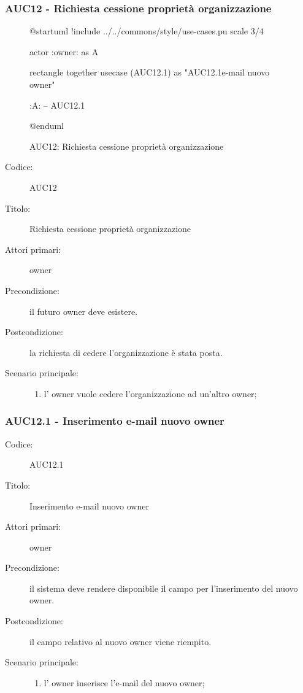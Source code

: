 \documentclass[casi-duso]{subfiles}
\begin{document}
\subsubsection{AUC12 - Richiesta cessione proprietà organizzazione}%
\label{subsub:AUC12}

\begin{figure}[h!] 
  \centering 
  \begin{plantuml}
  @startuml 
  !include ../../commons/style/use-cases.pu
  scale 3/4

  actor :owner: as A

  rectangle {
    together {
      usecase (AUC12.1) as "AUC12.1\nInserimento e-mail nuovo owner"
    }
  }

  :A: -- AUC12.1

  @enduml
  \end{plantuml} 
  \caption{AUC12: Richiesta cessione proprietà organizzazione} 
  \label{fig:auc12} 
\end{figure}

\begin{description}
  \item[Codice:] AUC12
  \item[Titolo:] Richiesta cessione proprietà organizzazione
  \item[Attori primari:] owner
  \item[Precondizione:] il futuro owner deve esistere.
  \item[Postcondizione:] la richiesta di cedere l'organizzazione è stata posta.
  \item[Scenario principale:] 
  \begin{enumerate}
    \item l' owner vuole cedere l'organizzazione ad un'altro owner;
  \end{enumerate}
\end{description}

\subsubsection{AUC12.1 - Inserimento e-mail nuovo owner}%
\label{subsub:AUC12.1}
\begin{description}
  \item[Codice:] AUC12.1
  \item[Titolo:] Inserimento e-mail nuovo owner
  \item[Attori primari:] owner
  \item[Precondizione:] il sistema deve rendere disponibile il campo per l'inserimento del nuovo owner.
  \item[Postcondizione:] il campo relativo al nuovo owner viene riempito.
  \item[Scenario principale:] 
  \begin{enumerate}
    \item l' owner inserisce l'e-mail del nuovo owner;
  \end{enumerate}
\end{description}
\end{document}
